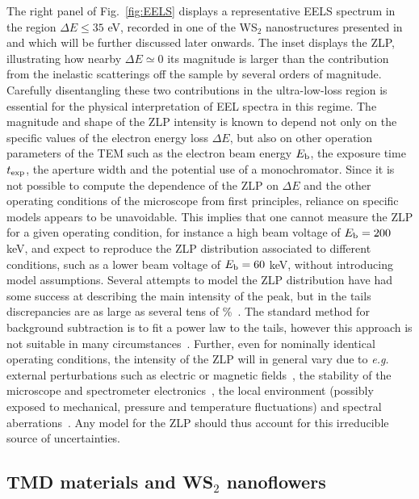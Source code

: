 The right panel of Fig.~\ref{fig:EELS} displays
a representative EELS spectrum in the region $\Delta E \le 35$ eV, recorded
in one of the WS$_2$ nanostructures presented in~\cite{SabryaWS2}
and which will be further discussed later onwards.
%
The inset displays the ZLP, illustrating how nearby $\Delta E\simeq 0$
its magnitude is larger than the contribution from the inelastic scatterings
off the sample by several
orders of magnitude.
%
Carefully disentangling these two contributions in the ultra-low-loss region
is essential for the physical interpretation of EEL spectra in this regime.
%
The magnitude and shape of the ZLP intensity is known to depend not only on the specific values
of the electron energy loss $\Delta E$, but also on other operation parameters
of the TEM such as the electron beam energy $E_{\rm b}$, the exposure time
$t_{\rm exp}$, the aperture width and the potential use of a monochromator.
%
Since it is not possible to compute the dependence of the ZLP on $\Delta E$
and the other operating conditions of the microscope from first principles,
reliance on specific models appears to be unavoidable.
%
This implies that one cannot measure the ZLP for a given operating
condition, for instance a high beam voltage of $E_{\rm b}=200$ keV, and expect to reproduce
the ZLP distribution
associated to different conditions, such as a lower beam voltage of $E_{\rm b}=60$ keV,
without introducing model assumptions.
%
Several attempts to model the ZLP distribution have had some success at describing the main intensity of the peak, 
but in the tails discrepancies are as large as several tens of \%~\cite{Bangert:2003}.
%
The standard method for background subtraction
is to fit a power law to the tails, however this approach is not suitable in
many circumstances~\cite{Hachtel:2018, Tenailleau:1992, Reed:2002, Bosman:2006}.
%
Further, even for nominally identical operating conditions, the intensity of the ZLP
will in general vary due to {\it e.g.} external perturbations such as electric or magnetic fields~\cite{Rafferty:2000},
the stability of the microscope and spectrometer electronics~\cite{Kothleitner:2003}, the local
environment (possibly exposed to mechanical, pressure and temperature fluctuations) 
and spectral aberrations~\cite{Egerton:1996}. 
%
Any model for the ZLP should thus account for this irreducible source of uncertainties.


\subsection{TMD materials and WS$_2$ nanoflowers}
\label{sec:eels}

